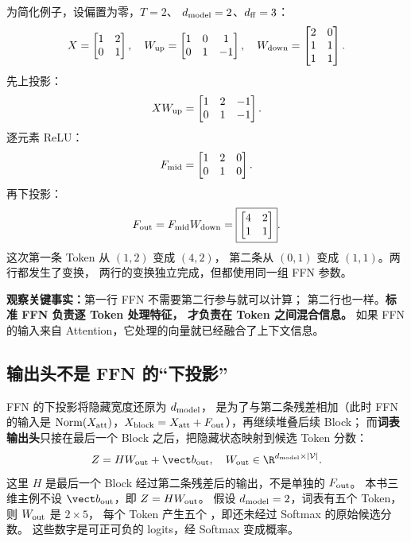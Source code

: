 为简化例子，设偏置为零，$T=2$、
$d_{\rm model}=2$、$d_{\rm ff}=3$：
\[
X=\begin{bmatrix}1&2\\0&1\end{bmatrix},\quad
W_{\rm up}=\begin{bmatrix}1&0&1\\0&1&-1\end{bmatrix},
\quad
W_{\rm down}=\begin{bmatrix}2&0\\1&1\\1&1\end{bmatrix}.
\]
先上投影：
\[
XW_{\rm up}
=\begin{bmatrix}1&2&-1\\0&1&-1\end{bmatrix}.
\]
逐元素 ReLU：
\[
F_{\rm mid}=\begin{bmatrix}1&2&0\\0&1&0\end{bmatrix}.
\]
再下投影：
\begin{equation}
F_{\rm out}=F_{\rm mid}W_{\rm down}=
\boxed{\begin{bmatrix}4&2\\1&1\end{bmatrix}}.
\end{equation}
这次第一条 Token 从 $(1,2)$ 变成 $(4,2)$，
第二条从 $(0,1)$ 变成 $(1,1)$。两行都发生了变换，
两行的变换独立完成，但都使用同一组 FFN 参数。

\textbf{观察关键事实：}第一行 FFN 不需要第二行参与就可以计算；
第二行也一样。\textbf{标准 FFN 负责逐 Token 处理特征，
 才负责在 Token 之间混合信息。}
如果 FFN 的输入来自 Attention，它处理的向量就已经融合了上下文信息。

\subsection{输出头不是 FFN 的“下投影”}
\label{concept:output-head}

FFN 的下投影将隐藏宽度还原为 $d_{\rm model}$，
是为了与第二条残差相加（此时 FFN 的输入是 $\operatorname{Norm}(X_{\rm att})$，$X_{\rm block}=X_{\rm att}+F_{\rm out}$），再继续堆叠后续 Block；
而\textbf{词表输出头}只接在最后一个 Block 之后，把隐藏状态映射到候选 Token 分数：
\begin{equation}
Z=HW_{\rm out}+\vect b_{\rm out},
\quad
W_{\rm out}\in\R^{d_{\rm model}\times|\mathcal V|}.
\end{equation}
这里 $H$ 是最后一个 Block 经过第二条残差后的输出，不是单独的 $F_{\rm out}$。
本书三维主例不设 $\vect b_{\rm out}$，即 $Z=HW_{\rm out}$。
假设 $d_{\rm model}=2$，词表有五个 Token，
则 $W_{\rm out}$ 是 $2\times5$，
每个 Token 产生五个 ，即还未经过 Softmax 的原始候选分数。
这些数字是可正可负的 logits，经 Softmax 变成概率。


